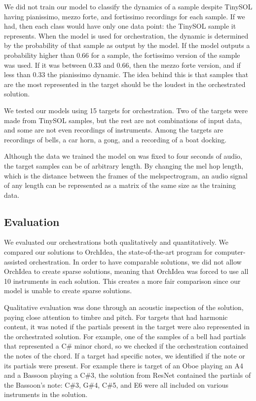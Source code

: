 \documentclass{article}
\begin{document}
We did not train our model to classify the dynamics of a sample despite TinySOL having pianissimo, mezzo forte, and fortissimo recordings for each sample. If we had, then each class would have only one data point: the TinySOL sample it represents. When the model is used for orchestration, the dynamic is determined by the probability of that sample as output by the model. If the model outputs a probability higher than $0.66$ for a sample, the fortissimo version of the sample was used. If it was between $0.33$ and $0.66$, then the mezzo forte version, and if less than $0.33$ the pianissimo dynamic. The idea behind this is that samples that are the most represented in the target should be the loudest in the orchestrated solution.

We tested our models using 15 targets for orchestration. Two of the targets were made from TinySOL samples, but the rest are not combinations of input data, and some are not even recordings of instruments. Among the targets are recordings of bells, a car horn, a gong, and a recording of a boat docking. 

Although the data we trained the model on was fixed to four seconds of audio, the target samples can be of arbitrary length. By changing the mel hop length, which is the distance between the frames of the melspectrogram, an audio signal of any length can be represented as a matrix of the same size as the training data.

\subsection{Evaluation}

We evaluated our orchestrations both qualitatively and quantitatively. We compared our solutions to OrchIdea, the state-of-the-art program for computer-assisted orchestration. In order to have comparable solutions, we did not allow OrchIdea to create sparse solutions, meaning that OrchIdea was forced to use all 10 instruments in each solution. This creates a more fair comparison since our model is unable to create sparse solutions.

Qualitative evaluation was done through an acoustic inspection of the solution, paying close attention to timbre and pitch. For targets that had harmonic content, it was noted if the partials present in the target were also represented in the orchestrated solution. For example, one of the samples of a bell had partials that represented a C\# minor chord, so we checked if the orchestration contained the notes of the chord. If a target had specific notes, we identified if the note or its partials were present. For example there is target of an Oboe playing an A4 and a Bassoon playing a C\#3, the solution from ResNet contained the partials of the Bassoon's note: C\#3, G\#4, C\#5, and E6 were all included on various instruments in the solution.
\end{document}
